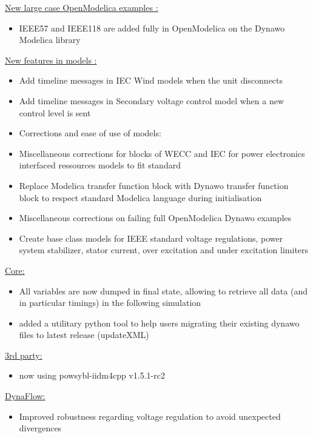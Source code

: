 \documentclass[a4paper, 12pt]{report}
\begin{document}
\underline{New large case OpenModelica examples :}

\begin{itemize}
\item IEEE57 and IEEE118 are added fully in OpenModelica on the Dynawo Modelica library
\end{itemize}

\underline{New features in models :}

\begin{itemize}
\item Add timeline messages in IEC Wind models when the unit disconnects
\item Add timeline messages in Secondary voltage control model when a new control level is sent
\item Corrections and ease of use of models:
\item Miscellaneous corrections for blocks of WECC and IEC for power electronics interfaced ressources models to fit standard
\item Replace Modelica transfer function block with Dynawo transfer function block to respect standard Modelica language during initialisation
\item Miscellaneous corrections on failing full OpenModelica Dynawo examples
\item Create base class models for IEEE standard voltage regulations, power system stabilizer, stator current, over excitation and under excitation limiters
\end{itemize}

\underline{Core:}
\begin{itemize}
\item All variables are now dumped in final state, allowing to retrieve all data (and in particular timings) in the following simulation
\item added a utilitary python tool to help users migrating their existing dynawo files to latest release (updateXML)
\end{itemize}

\underline{3rd party:}
\begin{itemize}
\item now using powsybl-iidm4cpp v1.5.1-rc2
\end{itemize}

\underline{DynaFlow:}
\begin{itemize}
\item Improved robustness regarding voltage regulation to avoid unexpected divergences
\end{itemize}
\end{document}

